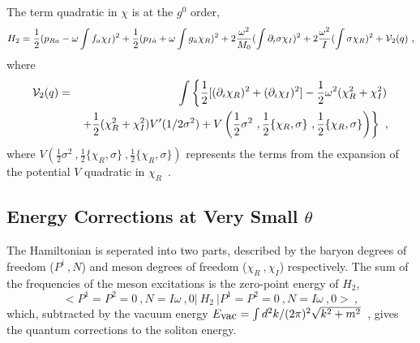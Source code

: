 \documentclass[a4paper,a4paper]{article}
\def\da{{\dot{a}}}
\begin{document}
The term quadratic in $\chi$ is at the $g^0$ order, 
\begin{equation}
  H_2=\frac 12(p_{Ra}-\omega\int f_a\chi_I)^2+
\frac 12(p_{I\da}+\omega\int g_\da\chi_R)^2
+2\frac{\omega^2}{M_0} (\int\partial_i\sigma\chi_I)^2+2\frac
{\omega^2}{I}(\int\sigma\chi_R)^2+{\cal V}_2(q)\ ,                                                 \label{MesonHam}
\end{equation}                                                                                     
where
\begin{eqnarray}
  {\cal V}_2(q)&=&\int\left\{\frac 12[(\partial_i\chi_R)^2+
(\partial_i\chi_I)^2]-\frac 12\omega^2(\chi_R^2+\chi_I^2)\right.\nonumber\\ 
&&\left. +\frac
12(\chi_R^2+\chi_I^2)V'(1/2\sigma^2)
+V\left(\frac 12\sigma^2\ ,\frac 12\{\chi_R, \sigma\}\ ,
\frac 12\{\chi_R, \sigma\}\right)\right\}\ ,                                                      \label{MesonPot}
\end{eqnarray}
where 
$V\left(\frac 12\sigma^2\ ,\frac 12\{\chi_R, \sigma\}\ ,\frac
12\{\chi_R, \sigma\}\right)$ represents the terms from the expansion of the 
potential $V$ quadratic in $\chi_R$\ .

\subsection{Energy Corrections at Very Small $\theta$}

The Hamiltonian is seperated into two parts, described by the baryon 
degrees of freedom ($P^i\ ,N$) and meson degrees of freedom ($\chi_R\ ,\chi_I$) respectively. 
The sum of the frequencies of the meson excitations is the zero-point energy of 
$H_2$, 
\begin{equation}
   <P^1=P^2=0\ ,N=I\omega\ ,0|~H_2~|P^1=P^2=0\ ,N=I\omega\ ,0>\ ,                                    \label{ZeroPoint}
\end{equation}
which, subtracted by the vacuum energy 
$E_{\hbox{vac}}=\int {d^2k}/({2\pi})^2\sqrt{k^2+m^2}$\ , gives the quantum corrections 
to the soliton energy. 
\end{document}
